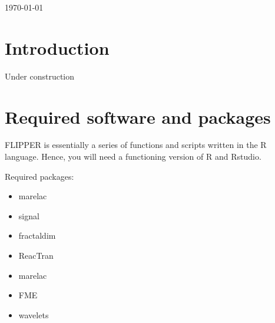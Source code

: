 \documentclass[10pt]{article}
\begin{document}
\begin{titlepage}


\vspace{3cm}
{\large \today}\\[3cm] %

 

\vfill %

\end{titlepage}
\setcounter{tocdepth}{3}
\tableofcontents
\pagebreak
\setcounter{page}{1}


\section{Introduction}

Under construction

\section{Required software and packages}
\label{sect_software}

FLIPPER is essentially a series of functions and scripts written in the R language. Hence, you will need a functioning version of R and Rstudio. 

Required packages:
\begin{itemize}
\item marelac
\item signal
\item fractaldim
\item ReacTran
\item marelac
\item FME
\item wavelets
\end{itemize}
\end{document}
